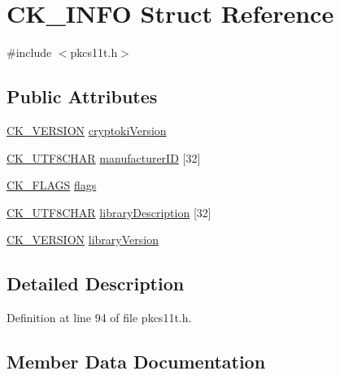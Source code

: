 \hypertarget{struct_c_k___i_n_f_o}{}\section{C\+K\+\_\+\+I\+N\+FO Struct Reference}
\label{struct_c_k___i_n_f_o}


{\ttfamily \#include $<$pkcs11t.\+h$>$}

\subsection*{Public Attributes}
\begin{DoxyCompactItemize}
\item 
\hyperlink{struct_c_k___v_e_r_s_i_o_n}{C\+K\+\_\+\+V\+E\+R\+S\+I\+ON} \hyperlink{struct_c_k___i_n_f_o_a261d5c79ab4a3579b71aa6df7a69cad5}{cryptoki\+Version}
\item 
\hyperlink{pkcs11t_8h_a0b0f8118c33f8a96a6af834bbab1df0c}{C\+K\+\_\+\+U\+T\+F8\+C\+H\+AR} \hyperlink{struct_c_k___i_n_f_o_ab58e8e4d98ad72aaaa59cad2cc85ea80}{manufacturer\+ID} \mbox{[}32\mbox{]}
\item 
\hyperlink{pkcs11t_8h_a53850492c1ba57aca4332be791a3c6a3}{C\+K\+\_\+\+F\+L\+A\+GS} \hyperlink{struct_c_k___i_n_f_o_abac745e390f6328a4a75310d0af2c72a}{flags}
\item 
\hyperlink{pkcs11t_8h_a0b0f8118c33f8a96a6af834bbab1df0c}{C\+K\+\_\+\+U\+T\+F8\+C\+H\+AR} \hyperlink{struct_c_k___i_n_f_o_ac90912a7de0400710fa8a6cf9c8a5dfe}{library\+Description} \mbox{[}32\mbox{]}
\item 
\hyperlink{struct_c_k___v_e_r_s_i_o_n}{C\+K\+\_\+\+V\+E\+R\+S\+I\+ON} \hyperlink{struct_c_k___i_n_f_o_a6a0708856568d8d64a9da330d2e217a6}{library\+Version}
\end{DoxyCompactItemize}


\subsection{Detailed Description}


Definition at line 94 of file pkcs11t.\+h.



\subsection{Member Data Documentation}
\mbox{\label{struct_c_k___i_n_f_o_a261d5c79ab4a3579b71aa6df7a69cad5}} 
